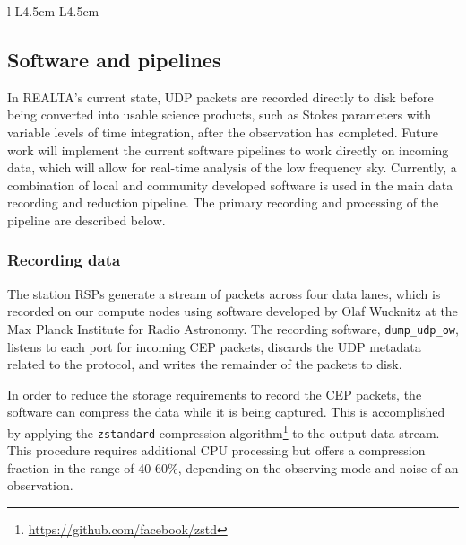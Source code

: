 \begin{table}
\begin{tabular}{l L{4.5cm} L{4.5cm}}
\end{tabular}

\caption[Table of hardware specifications for REALTA.]{Table of hardware specifications for REALTA. Note that the specifications are given for individual UCC 1-4 compute nodes, except for storage which is the total amount dedicated to archival of data distributed across all four. }
\label{table:REALTAspecs}
\end{table}

\subsection{Software and pipelines}
\label{sec:softwareAndProcessing}
In REALTA's current state, UDP packets are recorded directly to disk before being converted into usable science products, such as Stokes parameters with variable levels of time integration, after the observation has completed. Future work will implement the current software pipelines to work directly on incoming data, which will allow for real-time analysis of the low frequency sky. Currently, a combination of local and community developed software is used in the main data recording and reduction pipeline. The primary recording and processing of the pipeline are described below.

\subsubsection{Recording data}
\label{sec:preproc}
The station RSPs generate a stream of packets across four data lanes, which is recorded on our compute nodes using software developed by Olaf Wucknitz at the Max Planck Institute for Radio Astronomy. The recording software, \texttt{dump\_udp\_ow}, listens to each port for incoming CEP packets, discards the UDP metadata related to the protocol, and writes the remainder of the packets to disk.

In order to reduce the storage requirements to record the CEP packets, the software can compress the data while it is being captured. This is accomplished by applying the \texttt{zstandard} compression algorithm\footnote{\hyperref[zstandard]{https://github.com/facebook/zstd}} to the output data stream. This procedure requires additional CPU processing but offers a compression fraction in the range of 40-60\%, depending on the observing mode and noise of an observation.

